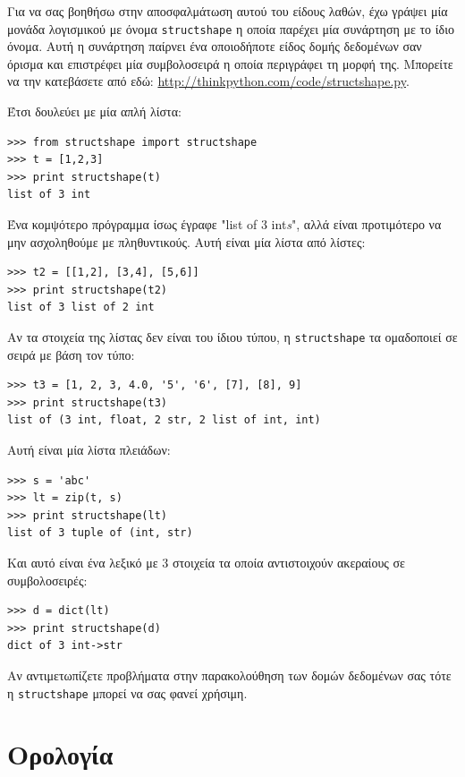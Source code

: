 \documentclass[10pt]{book}
\begin{document}

Για να σας βοηθήσω στην αποσφαλμάτωση αυτού του είδους λαθών, έχω γράψει μία μονάδα λογισμικού με όνομα {\tt structshape} η οποία παρέχει μία συνάρτηση με το ίδιο όνομα. Αυτή η συνάρτηση παίρνει ένα οποιοδήποτε είδος δομής δεδομένων σαν όρισμα και επιστρέφει μία συμβολοσειρά η οποία περιγράφει τη μορφή της. Μπορείτε να την κατεβάσετε από εδώ: \url{http://thinkpython.com/code/structshape.py}.

Έτσι δουλεύει με μία απλή λίστα:

\begin{verbatim}
>>> from structshape import structshape
>>> t = [1,2,3]
>>> print structshape(t)
list of 3 int
\end{verbatim}
%
Ένα κομψότερο πρόγραμμα ίσως έγραφε "list of 3 int{\em s}", αλλά είναι προτιμότερο να μην ασχοληθούμε με πληθυντικούς. Αυτή είναι μία λίστα από λίστες:

\begin{verbatim}
>>> t2 = [[1,2], [3,4], [5,6]]
>>> print structshape(t2)
list of 3 list of 2 int
\end{verbatim}
%
Αν τα στοιχεία της λίστας δεν είναι του ίδιου τύπου, η {\tt structshape} τα ομαδοποιεί σε σειρά με βάση τον τύπο:

\begin{verbatim}
>>> t3 = [1, 2, 3, 4.0, '5', '6', [7], [8], 9]
>>> print structshape(t3)
list of (3 int, float, 2 str, 2 list of int, int)
\end{verbatim}
%
Αυτή είναι μία λίστα πλειάδων:

\begin{verbatim}
>>> s = 'abc'
>>> lt = zip(t, s)
>>> print structshape(lt)
list of 3 tuple of (int, str)
\end{verbatim}
%
Και αυτό είναι ένα λεξικό με 3 στοιχεία τα οποία αντιστοιχούν ακεραίους σε συμβολοσειρές:

\begin{verbatim}
>>> d = dict(lt)
>>> print structshape(d)
dict of 3 int->str
\end{verbatim}
%
Αν αντιμετωπίζετε προβλήματα στην παρακολούθηση των δομών δεδομένων σας τότε η {\tt structshape} μπορεί να σας φανεί χρήσιμη.



\section{Ορολογία}
\end{document}
